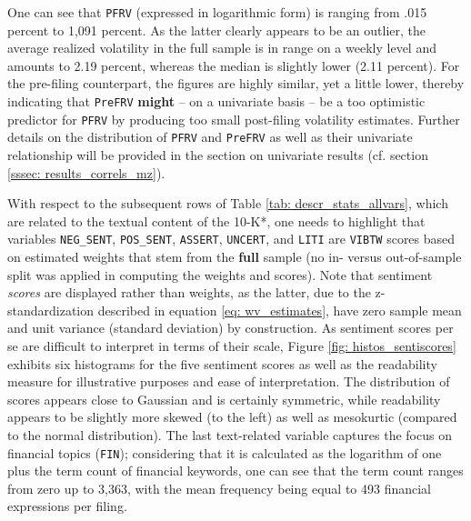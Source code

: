 One can see that \texttt{PFRV} (expressed in logarithmic form) is ranging from .015 percent to 1,091 percent. As the latter clearly appears to be an outlier, the average realized volatility in the full sample is in range on a weekly level and amounts to 2.19 percent, whereas the median is slightly lower (2.11 percent). For the pre-filing counterpart, the figures are highly similar, yet a little lower, thereby indicating that \texttt{PreFRV} \textbf{might} -- on a univariate basis -- be a too optimistic predictor for \texttt{PFRV} by producing too small post-filing volatility estimates. 
Further details on the distribution of \texttt{PFRV} and \texttt{PreFRV} as well as their univariate relationship will be provided in the section on univariate results (cf. section \ref{sssec: results_correls_mz}). 

With respect to the subsequent rows of Table \ref{tab: descr_stats_allvars}, which are related to the textual content of the 10-K*, one needs to highlight that variables \texttt{NEG\_SENT}, \texttt{POS\_SENT}, \texttt{ASSERT}, \texttt{UNCERT}, and \texttt{LITI} are \texttt{VIBTW} scores based on estimated weights that stem from the \textbf{full} sample (no in- versus out-of-sample split was applied in computing the weights and scores). Note that sentiment \textit{scores} are displayed rather than weights, as the latter, due to the z-standardization described in equation \eqref{eq: wv_estimates}, have zero sample mean and unit variance (standard deviation) by construction. As sentiment scores per se are difficult to interpret in terms of their scale, Figure \ref{fig: histos_sentiscores} exhibits six histograms for the five sentiment scores as well as the readability measure for illustrative purposes and ease of interpretation. The distribution of scores appears close to Gaussian and is certainly symmetric, while readability appears to be slightly more skewed (to the left) as well as mesokurtic (compared to the normal distribution). The last text-related variable captures the focus on financial topics (\texttt{FIN}); considering that it is calculated as the logarithm of one plus the term count of financial keywords, one can see that the term count ranges from zero up to 3,363, with the mean frequency being equal to 493 financial expressions per filing.

